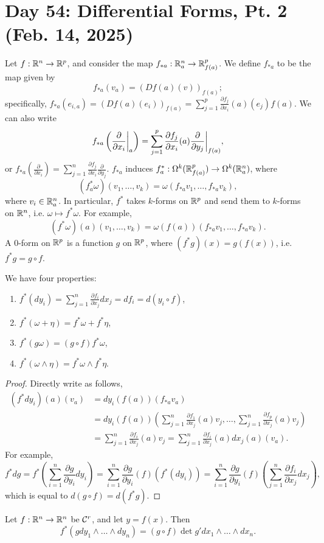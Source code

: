 \section{Day 54: Differential Forms, Pt. 2 (Feb. 14, 2025)}
Let $f : \mathbb R^n \to \mathbb R^p$, and consider the map $f_{\ast a} : \mathbb R^n_a \to \mathbb R^p_{f(a)}$. We define $f_{\ast a}$ to be the map given by
\[ f_{\ast a}(v_a) = (Df(a)(v))_{f(a)}; \]
specifically, $f_{\ast a}(e_{i,a}) = (Df(a)(e_i))_{f(a)} = \sum_{j=1}^p \frac{\partial f_j}{\partial x_i}(a)(e_j) f(a)$. We can also write
\[ f_{\ast a} \left(\restr{\frac{\partial}{\partial x_i}}{a}\right) = \sum_{j=1}^p \frac{\partial f_j}{\partial x_i}(a) \restr{\frac{\partial}{\partial y_j}}{f(a)}, \]
or $f_{\ast a}(\frac{\partial}{\partial x_i}) = \sum_{j=1}^n \frac{\partial f_j}{\partial x_i} \frac{\partial}{\partial y_j}$. $f_{\ast a}$ induces $f_a^\ast : \Omega^k(\mathbb R^p_{f(a)}) \to \Omega^k(\mathbb R^n_a)$, where
\[ (f^\ast_a \omega)(v_1, \dots, v_k) = \omega(f_{\ast a}v_1, \dots, f_{\ast a}v_k), \]
where $v_i \in \mathbb R^n_a$. In particular, $f^\ast$ takes $k$-forms on $\mathbb R^p$ and send them to $k$-forms on $\mathbb R^n$, i.e. $\omega \mapsto f^\ast \omega$. For example,
\[ (f^\ast \omega)(a)(v_1, \dots, v_k) = \omega(f(a))(f_{\ast a} v_1, \dots, f_{\ast a} v_k). \]
A $0$-form on $\mathbb R^p$ is a function $g$ on $\mathbb R^p$, where $(f^\ast g)(x) = g(f(x))$, i.e. $f^\ast g = g \circ f$.
\begin{simpleprop}[Spivak 4-8]
    We have four properties:
    \begin{enumerate}[label=(\roman*)]
        \item $f^\ast(dy_i) = \sum_{j=1}^n \frac{\partial f_i}{\partial x_j} dx_j = df_i = d(y_i \circ f)$,
        \item $f^\ast(\omega + \eta) = f^\ast \omega + f^\ast \eta$,
        \item $f^\ast(g \omega) = (g \circ f) f^\ast \omega$,
        \item $f^\ast(\omega \wedge \eta) = f^\ast \omega \wedge f^\ast \eta$.
    \end{enumerate}
\end{simpleprop}
\begin{proof}
    Directly write as follows,
    \begin{align*}
        (f^\ast dy_i)(a)(v_a) &= dy_i (f(a)) (f_{\ast a} v_a) \\
        &= dy_i (f(a))\left( \sum_{j=1}^n \frac{\partial f_1}{\partial x_j}(a) v_j, \dots, \sum_{j=1}^n \frac{\partial f_p}{\partial x_j}(a) v_j \right) \\
        &= \sum_{j=1}^n \frac{\partial f_i}{\partial x_j}(a) v_j = \sum_{j=1}^n \frac{\partial f_i}{\partial x_j}(a) dx_j(a) (v_a).
    \end{align*}
    For example,
    \[ f^\ast dg = f^\ast \left(\sum_{i=1}^n \frac{\partial g}{\partial y_i} dy_i \right) = \sum_{i=1}^n \frac{\partial g}{\partial y_i} (f) (f^\ast (dy_i)) = \sum_{i=1}^n \frac{\partial g}{\partial y_i} (f) \left(\sum_{j=1}^n \frac{\partial f_i}{\partial x_j} dx_j\right), \]
    which is equal to $d(g \circ f) = d(f^\ast g)$.
\end{proof}
\begin{simpleprop}[Spivak 4-9]
    Let $f : \mathbb R^n \to \mathbb R^n$ be $\mathcal C^r$, and let $y = f(x)$. Then
    \[ f^\ast(g dy_1 \wedge \dots \wedge dy_n) = (g \circ f) \det g' dx_1 \wedge \dots \wedge dx_n. \]
\end{simpleprop}